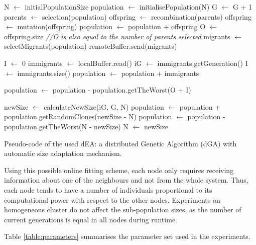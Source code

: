 \documentclass[final,1p,times]{elsarticle}
\begin{document}
\begin{algorithm}[htb]

\begin{algorithmic}
\STATE N $\gets$ initialPopulationSize
\STATE population $\gets$ initialisePopulation(N)
    \STATE G $\gets$ G + 1
    \STATE parents $\gets$ selection(population)
    \STATE offspring $\gets$ recombination(parents)
    \STATE offspring $\gets$ mutation(offspring)
    \STATE population $\gets$ population + offspring
    \STATE O $\gets$ offspring.size {\em //O is also equal to the number of parents selected}
      \STATE migrants $\gets$ selectMigrants(population)
      \STATE remoteBuffer.send(migrants)
    \ENDIF

    \STATE I $\gets$ 0
      \STATE immigrants $\gets$ localBuffer.read()
      \STATE iG $\gets$ immigrants.getGeneration()
      \STATE I $\gets$ immigrants.size()
      \STATE population $\gets$ population + immigrants
    \ENDIF

    \STATE population $\gets$ population - population.getTheWorst(O + I)

    \STATE newSize $\gets$ calculateNewSize(iG, G, N)
        \STATE population $\gets$ population + population.getRandomClones(newSize - N)
    \ELSE
        \STATE population $\gets$ population - population.getTheWorst(N - newSize)
    \ENDIF
    \STATE N $\gets$ newSize
\ENDWHILE

\end{algorithmic}
\caption{Pseudo-code of the used dEA: a distributed Genetic Algorithm (dGA) with automatic size adaptation mechanism.}
\label{alg:EAadaptive}
\end{algorithm}

Using this possible online fitting scheme, each node only requires receiving information about one of the neighbours and not from the whole system. Thus, each node tends to have a number of individuals proportional to its computational power with respect to the other nodes. Experiments on homogeneous cluster do not affect the sub-population sizes, as the number of current generations is equal in all nodes during runtime.

Table \ref{table:parameters} summarises  the parameter set used in the experiments.
\end{document}
